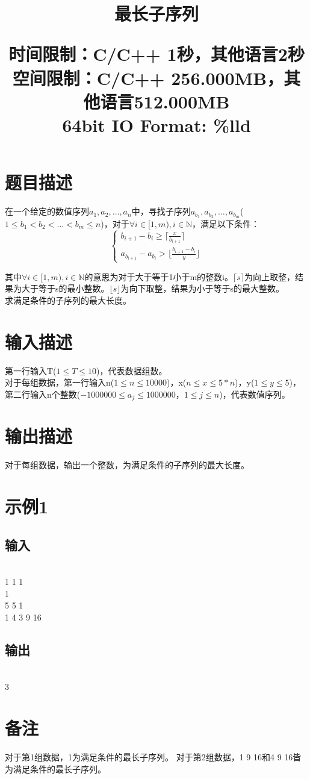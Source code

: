 \documentclass{article}
\date{}
\title{最长子序列 \\ [2ex] \begin{large} 
	时间限制：C/C++ 1秒，其他语言2秒 \\
	空间限制：C/C++ 256.000MB，其他语言512.000MB 	\\
	64bit IO Format: \%lld
 			\end{large} }
\begin{document}
		\maketitle \vspace{-50pt}
		
		\section*{题目描述}
			\indent 在一个给定的数值序列$a_{1},a_{2},\dots,a_{n}$中，寻找子序列$a_{b_{1}},a_{b_{2}},\dots,a_{b_{m}}$($1 \le b_{1}<b_{2}<\dots<b_{m} \le n$)，对于$\forall i \in [1,m) , i \in \mathbb{N}$，满足以下条件：\\
\begin{equation}\nonumber
	\left\{
	\begin{aligned}
		b_{i+1}-b_{i} \ge \lceil \frac{x}{b_{i+1}} \rceil \\
		a_{b_{i+1}}-a_{b_{i}} > \lfloor \frac{b_{i+1}-b_{i}}{y} \rfloor
	\end{aligned}
	\right.
\end{equation}

	\indent 其中$\forall i \in [1,m) , i \in \mathbb{N}$的意思为对于大于等于1小于m的整数i。$\lceil s \rceil$为向上取整，结果为大于等于s的最小整数。$\lfloor  s \rfloor$为向下取整，结果为小于等于s的最大整数。\\
			\indent 求满足条件的子序列的最大长度。
		
		\section*{输入描述}
			\indent 第一行输入T($1 \le T \le 10$)，代表数据组数。\\
			\indent 对于每组数据，第一行输入n($1 \le n \le 10000$)，x($n \le x \le 5*n$)，y($1 \le y \le 5$)，第二行输入n个整数($-1000000 \le a_{j} \le 1000000$，$ 1 \le j \le n$)，代表数值序列。
			
		\section*{输出描述}
			对于每组数据，输出一个整数，为满足条件的子序列的最大长度。
		
		\section*{示例1}
			\subsection*{输入}
\\
1 1 1\\
1\\
5 5 1\\
1 4 3 9 16
			\subsection*{输出}
\\
3

		\section*{备注}	
\noindent 对于第1组数据，1为满足条件的最长子序列。
对于第2组数据，1 9 16和4 9 16皆为满足条件的最长子序列。
	
\end{document}
